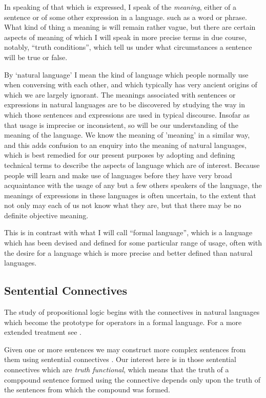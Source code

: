 \documentclass[10pt,titlepage]{article}
\begin{document}
In speaking of that which is expressed, I speak of the \emph{meaning}, either of a sentence or of some other expression in a language. such as a word or phrase.
What kind of thing a meaning is will remain rather vague, but there are certain aspects of meaning of which I will speak in more precise terms in due course, notably, ``truth conditions'', which tell us under what circumstances a sentence will be true or false.

By `natural language' I mean the kind of language which people normally use when conversing with each other, and which typically has very ancient origins of which we are largely ignorant.
The meanings associated with sentences or expressions in natural languages are to be discovered by studying the way in which those sentences and expressions are used in typical discourse.
Insofar as that usage is imprecise or inconsistent, so will be our understanding of the meaning of the language.
We know the meaning of 'meaning' in a similar way, and this adds confusion to an enquiry into the meaning of natural languages, which is best remedied for our present purposes by adopting and defining technical terms to describe the aspects of language which are of interest.
Because people will learn and make use of languages before they have very broad acquaintance with the usage of any but a few others speakers of the language, the meanings of expressions in these languages is often uncertain, to the extent that not only may each of us not know what they are, but that there may be no definite objective meaning.

This is in contrast with what I will call ``formal language'', which is a language which has been devised and defined for some particular range of usage, often with the desire for a language which is more precise and better defined than natural languages.

\subsection{Sentential Connectives}

The study of propositional logic begins with the connectives in natural languages which become the prototype for operators in a formal language.
For a more extended treatment see \cite{sep-connectives-logic}.

Given one or more sentences we may construct more complex sentences from them using sentential connectives .
Our interest here is in those sentential connectives which are \emph{truth functional}, which means that the truth of a comppound sentence formed using the connective depends only upon the truth of the sentences from which the compound was formed.
\end{document}
